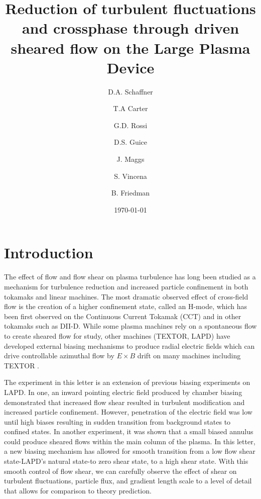 \documentclass[%
 aip,
 amsmath,amssymb,
 preprint,%
]{revtex4-1}
\begin{document}
\title{Reduction of turbulent fluctuations and crossphase through driven sheared flow on the Large Plasma Device}

\author{D.A. Schaffner}
\author{T.A Carter}
\author{G.D. Rossi}
\author{D.S. Guice}
\author{J. Maggs}
\author{S. Vincena}
\author{B. Friedman}

\date{\today}%


\maketitle
\section{Introduction}
The effect of flow and flow shear on plasma turbulence has long been studied as a mechanism for turbulence reduction and increased particle confinement in both tokamaks and linear machines.  The most dramatic observed effect of cross-field flow is the creation of a higher confinement state, called an H-mode, which has been first observed on the Continuous Current Tokamak (CCT) and in other tokamaks such as DII-D. While some plasma machines rely on a spontaneous flow to create sheared flow for study, other machines (TEXTOR, LAPD) have developed external biasing mechanisms to produce radial electric fields which can drive controllable azimuthal flow by $E \times B$ drift on many machines including TEXTOR \cite{boedo00}.

The experiment in this letter is an extension of previous biasing experiments on LAPD. In one, an inward pointing electric field produced by chamber biasing demonstrated that increased flow shear resulted in turbulent modification and increased particle confinement\cite{carter09}. However, penetration of the electric field was low until high biases resulting in sudden transition from background states to confined states. In another experiment, it was shown that a small biased annulus could produce sheared flows within the main column of the plasma\cite{zhou12}. In this letter, a new biasing mechanism has allowed for smooth transition from a low flow shear state-LAPD's natural state-to zero shear state, to a high shear state. With this smooth control of flow shear, we can carefully observe the effect of shear on turbulent fluctuations, particle flux, and gradient length scale to a level of detail that allows for comparison to theory prediction.
\end{document}
